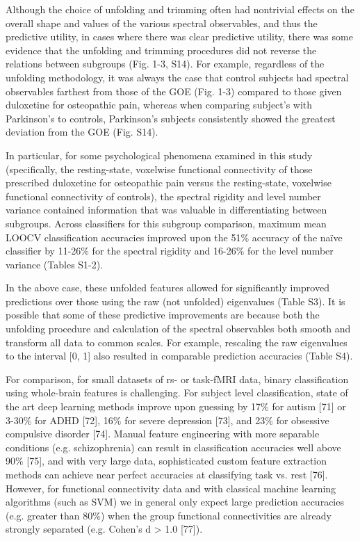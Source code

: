 Although the choice of unfolding and trimming often had nontrivial effects on the overall shape and
values of the various spectral observables, and thus the predictive utility, in cases where there
was clear predictive utility, there was some evidence that the unfolding and trimming procedures did
not reverse the relations between subgroups (Fig. 1-3, S14). For example, regardless of the
unfolding methodology, it was always the case that control subjects had spectral observables
farthest from those of the GOE (Fig. 1-3) compared to those given duloxetine for osteopathic pain,
whereas when comparing subject's with Parkinson's to controls, Parkinson's subjects consistently
showed the greatest deviation from the GOE (Fig. S14).

In particular, for some psychological phenomena examined in this study (specifically, the
resting-state, voxelwise functional connectivity of those prescribed duloxetine for osteopathic pain
versus the resting-state, voxelwise functional connectivity of controls), the spectral rigidity and
level number variance contained information that was valuable in differentiating between subgroups.
Across classifiers for this subgroup comparison, maximum mean LOOCV classification accuracies
improved upon the 51\% accuracy of the naïve classifier by 11-26\% for the spectral rigidity and
16-26\% for the level number variance (Tables S1-2).

In the above case, these unfolded features allowed for significantly improved predictions over those
using the raw (not unfolded) eigenvalues (Table S3). It is possible that some of these predictive
improvements are because both the unfolding procedure and calculation of the spectral observables
both smooth and transform all data to common scales. For example,  rescaling the raw eigenvalues to
the interval [0, 1] also resulted in comparable prediction accuracies (Table S4).

For comparison, for small datasets of rs- or task-fMRI data, binary classification using whole-brain
features is challenging. For subject level classification, state of the art deep learning methods
improve upon guessing by 17\% for autism [71] or 3-30\% for ADHD [72], 16\% for severe depression [73],
and 23\% for obsessive compulsive disorder [74]. Manual feature engineering with more separable
conditions (e.g. schizophrenia) can result in classification accuracies well above 90\% [75], and
with very large data, sophisticated custom feature extraction methods can achieve near perfect
accuracies at classifying task vs. rest [76]. However, for functional connectivity data and with
classical machine learning algorithms (such as SVM) we in general only expect large prediction
accuracies (e.g. greater than 80\%) when the group functional connectivities are already strongly
separated (e.g. Cohen’s d > 1.0 [77]).

